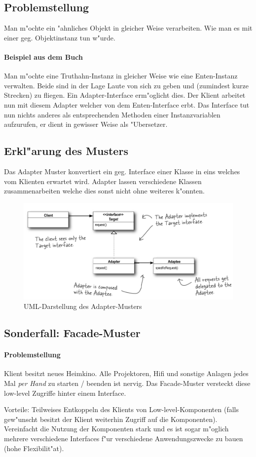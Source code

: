 \subsection{Problemstellung}
Man m"ochte ein "ahnliches Objekt in gleicher Weise verarbeiten. Wie man es mit einer geg. Objektinstanz tun w"urde. 

\paragraph{Beispiel aus dem Buch}
Man m"ochte eine Truthahn-Instanz in gleicher Weise wie eine Enten-Instanz verwalten. Beide sind in der Lage Laute von sich zu geben und (zumindest kurze Strecken) zu fliegen. Ein Adapter-Interface erm"oglicht dies. Der Klient arbeitet nun mit diesem Adapter welcher von dem Enten-Interface erbt. Das Interface tut nun nichts anderes als entsprechenden Methoden einer Instanzvariablen aufzurufen, er dient in gewisser Weise als "Ubersetzer. 

\subsection{Erkl"arung des Musters}
Das Adapter Muster konvertiert ein geg. Interface einer Klasse in eins welches vom Klienten erwartet wird. Adapter lassen verschiedene Klassen zusammenarbeiten welche dies sonst nicht ohne weiteres k"onnten. 

\begin{figure}[b!]
	\centering
	\includegraphics[width=1\linewidth]{adapter/img/adapterUML}
	\caption{UML-Darstellung des Adapter-Musters}
	\label{fig:adapterUML}
\end{figure}

\subsection{Sonderfall: Facade-Muster}
\paragraph{Problemstellung}
Klient besitzt neues Heimkino. Alle Projektoren, Hifi und sonstige Anlagen jedes Mal \emph{per Hand} zu starten / beenden ist nervig. Das Facade-Muster versteckt diese low-level Zugriffe hinter einem Interface. 

Vorteile: Teilweises Entkoppeln des Klients von Low-level-Komponenten (falls gew"unscht besitzt der Klient weiterhin Zugriff auf die Komponenten). Vereinfacht die Nutzung der Komponenten stark und es ist sogar m"oglich mehrere verschiedene Interfaces f"ur verschiedene Anwendungszwecke zu bauen (hohe Flexibilit"at). 
